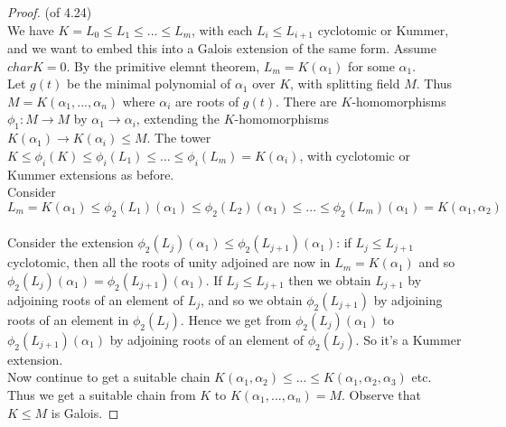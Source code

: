 \documentclass[a4paper]{article}
\begin{document}
\begin{proof} (of 4.24)\\
We have $K=L_0 \leq L_1 \leq ... \leq L_m$, with each $L_i \leq L_{i+1}$ cyclotomic or Kummer, and we want to embed this into a Galois extension of the same form. Assume $char K = 0$. By the primitive elemnt theorem, $L_m = K(\alpha_1)$ for some $\alpha_1$.\\
Let $g(t)$ be the minimal polynomial of $\alpha_1$ over $K$, with splitting field $M$. Thus $M = K(\alpha_1,...,\alpha_n)$ where $\alpha_i$ are roots of $g(t)$. There are $K$-homomorphisms $\phi_1:M \to M$ by $\alpha_1 \to \alpha_i$, extending the $K$-homomorphisms $K(\alpha_1) \to K(\alpha_i) \leq M$. The tower $K \leq \phi_i(K) \leq \phi_i(L_1) \leq ... \leq \phi_i(L_m) = K(\alpha_i)$, with cyclotomic or Kummer extensions as before.\\
Consider $$L_m = K(\alpha_1) \leq \phi_2(L_1)(\alpha_1) \leq \phi_2(L_2)(\alpha_1) \leq ... \leq \phi_2(L_m)(\alpha_1) = K(\alpha_1,\alpha_2)$$\\
Consider the extension $\phi_2(L_j)(\alpha_1) \leq \phi_2(L_{j+1})(\alpha_1)$: if $L_j \leq L_{j+1}$ cyclotomic, then all the roots of unity adjoined are now in $L_m = K(\alpha_1)$ and so $\phi_2(L_j)(\alpha_1) = \phi_2(L_{j+1})(\alpha_1)$. If $L_j \leq L_{j+1}$ then we obtain $L_{j+1}$ by adjoining roots of an element of $L_j$, and so we obtain $\phi_2(L_{j+1})$ by adjoining roots of an element in $\phi_2(L_j)$. Hence we get from $\phi_2(L_j)(\alpha_1)$ to $\phi_2(L_{j+1})(\alpha_1)$ by adjoining roots of an element of $\phi_2(L_j)$. So it's a Kummer extension.\\
Now continue to get a suitable chain $K(\alpha_1,\alpha_2) \leq ... \leq K(\alpha_1,\alpha_2,\alpha_3)$ etc. Thus we get a suitable chain from $K$ to $K(\alpha_1,...,\alpha_n) = M$. Observe that $K \leq M$ is Galois.
\end{proof}
\end{document}
